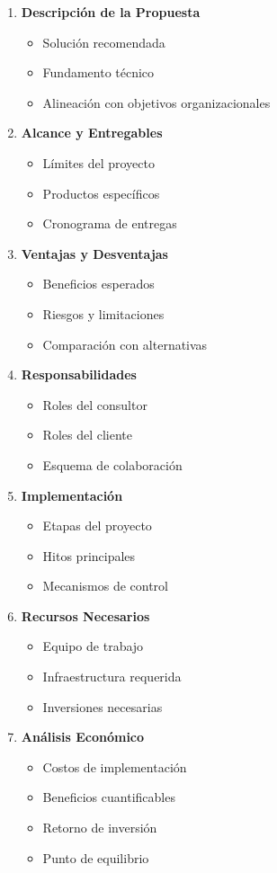 \documentclass[12pt,letterpaper,oneside]{book}
\begin{document}
\begin{enumerate}
\item \textbf{Descripción de la Propuesta}
   \begin{itemize}
   \item Solución recomendada
   \item Fundamento técnico
   \item Alineación con objetivos organizacionales
   \end{itemize}

\item \textbf{Alcance y Entregables}
   \begin{itemize}
   \item Límites del proyecto
   \item Productos específicos
   \item Cronograma de entregas
   \end{itemize}

\item \textbf{Ventajas y Desventajas}
   \begin{itemize}
   \item Beneficios esperados
   \item Riesgos y limitaciones
   \item Comparación con alternativas
   \end{itemize}

\item \textbf{Responsabilidades}
   \begin{itemize}
   \item Roles del consultor
   \item Roles del cliente
   \item Esquema de colaboración
   \end{itemize}

\item \textbf{Implementación}
   \begin{itemize}
   \item Etapas del proyecto
   \item Hitos principales
   \item Mecanismos de control
   \end{itemize}

\item \textbf{Recursos Necesarios}
   \begin{itemize}
   \item Equipo de trabajo
   \item Infraestructura requerida
   \item Inversiones necesarias
   \end{itemize}

\item \textbf{Análisis Económico}
   \begin{itemize}
   \item Costos de implementación
   \item Beneficios cuantificables
   \item Retorno de inversión
   \item Punto de equilibrio
   \end{itemize}
\end{enumerate}
\end{document}
